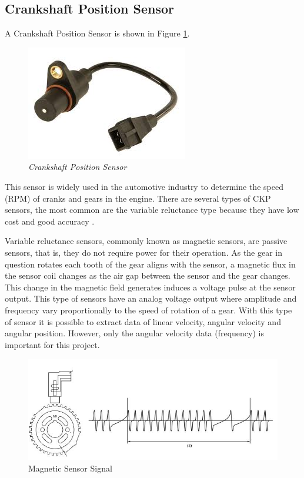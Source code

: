 \subsection{Crankshaft Position Sensor}\label{ssec:crankshaft-position-sensor}
	
	A Crankshaft Position Sensor is shown in Figure \ref{fig-ckpReal}.

	\begin{figure}[htbp]
		\centering
			\includegraphics[scale=0.8]{figuras/fig-ckp-real.jpg}
		\caption{\textit{Crankshaft Position Sensor} \cite{ckp-gm}}
		\label{fig-ckpReal}
	\end{figure}

	This sensor is widely used in the automotive industry to determine the speed (RPM) of cranks and gears in the engine. There are several types of CKP sensors, the most common are the variable reluctance type because they have low cost and good accuracy \cite{schroeder2002crankshaft}.
	\par
	Variable reluctance sensors, commonly known as magnetic sensors, are passive sensors, that is, they do not require power for their operation. As the gear in question rotates each tooth of the gear aligns with the sensor, a magnetic flux in the sensor coil changes as the air gap between the sensor and the gear changes. This change in the magnetic field generates induces a voltage pulse at the sensor output. This type of sensors have an analog voltage output where amplitude and frequency vary proportionally to the speed of rotation of a gear. With this type of sensor it is possible to extract data of linear velocity, angular velocity and angular position. However, only the angular velocity data (frequency) is important for this project.

	\begin{figure}[htbp]
		\centering
			\includegraphics[scale=0.6]{figuras/fig-ckp-signal.png}
		\caption{Magnetic Sensor Signal \cite{cam-sensor-signal}}
		\label{fig-ckpSignal}
	\end{figure}
